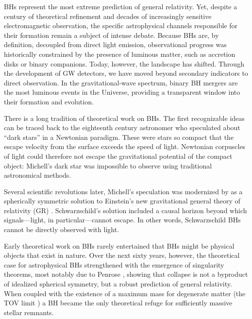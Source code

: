 \begin{refsection}


\Acp{BH} represent the most extreme prediction of general relativity. Yet, despite a century of theoretical refinement and decades of increasingly sensitive electromagnetic observation, the specific astrophysical channels responsible for their formation remain a subject of intense debate. Because \acp{BH} are, by definition, decoupled from direct light emission, observational progress was historically constrained by the presence of luminous matter, such as accretion disks or binary companions. Today, however, the landscape has shifted. Through the development of \ac{GW} detectors, we have moved beyond secondary indicators to direct observation. In the gravitational-wave spectrum, binary \ac{BH} mergers are the most luminous events in the Universe, providing a transparent window into their formation and evolution.

There is a long tradition of theoretical work on \acp{BH}. The first recognizable ideas can be traced back to the eighteenth century astronomer \citet{Michell:1784xqa} who speculated about ``dark stars'' in a Newtonian paradigm. These were stars so compact that the escape velocity from the surface exceeds the speed of light. Newtonian corpuscles of light could therefore not escape the gravitational potential of the compact object: Michell's dark star was impossible to observe using traditional astronomical methods. 

Several scientific revolutions later, Michell's speculation was modernized by \citet{Schwarzschild:1916sss} as a spherically symmetric solution to Einstein's new gravitational general theory of relativity (GR) \citep{Einstein:1916vd}. Schwarzschild's solution included a causal horizon beyond which signals---light, in particular---cannot escape. In other words, Schwarzschild \acp{BH} cannot be directly observed with light. 

Early theoretical work on \acp{BH} rarely entertained that \acp{BH} might be physical objects that exist in nature. Over the next sixty years, however, the theoretical case for astrophysical \acp{BH} strengthened with the emergence of singularity theorems, most notably due to Penrose \citep{penrose_gravitational_1965, senovilla_1965_2015}, showing that collapse is not a byproduct of idealized spherical symmetry, but a robust prediction of general relativity. When coupled with the existence of a maximum mass for degenerate matter (the \ac{TOV} limit \citep{tolman_static_1939, oppenheimer_massive_1939}) a \ac{BH} became the only theoretical refuge for sufficiently massive stellar remnants.


\end{refsection}
